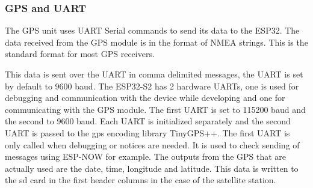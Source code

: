 \subsubsection{GPS and UART}
The GPS unit uses UART Serial commands to send its data to the ESP32. The data received from the GPS module is in the format of NMEA strings. This is the standard format for most GPS receivers.\cite{NMEA}
\begin{table}[!htb]
	\label{tab:nmea}
	\caption{NMEA Sentences and their meanings \cite{GPSSentence}}
\end{table}

\noindent
This data is sent over the UART in comma delimited messages, the UART is set by default to 9600 baud.
The ESP32-S2 has 2 hardware UARTs, one is used for debugging and communication with the device while developing and one for communicating with the GPS module. The first UART is set to 115200 baud and the second to 9600 baud. Each UART is initialized separately and the second UART is passed to the gps encoding library TinyGPS++. The first UART is only called when debugging or notices are needed. It is used to check sending of messages using ESP-NOW for example.
The outputs from the GPS that are actually used are the date, time, longitude and latitude. This data is written to the sd card in the first header columns in the case of the satellite station.

